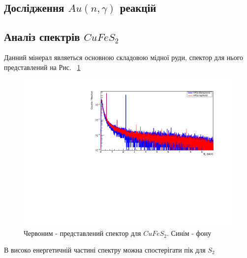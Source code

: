 \documentclass[a4paper, 14pt]{article}
\numberwithin{equation}{section}
\numberwithin{table}{section}
\begin{document}
\subsection{Дослідження $Au(n, \gamma)$ реакцій} 

\subsection{Аналіз спектрів $CuFeS_2$}
	Данний мінерал являеться основною складовою мідної руди, спектор для нього представлений на Рис. ~\ref{ris:CuFeS_2Fon}
	\begin{figure}[hbt!]
		\centering \includegraphics[width=1\textwidth]{res/smCuFeS2FonAll.pdf}
		\caption{Червоним - представлений спектор для $CuFeS_2$. Синім - фону} 
		\label{ris:CuFeS_2Fon}	
	\end{figure} 	
	В високо енергетичній частині спектру можна спостерігати пік для $S_2$
		
\end{document}
